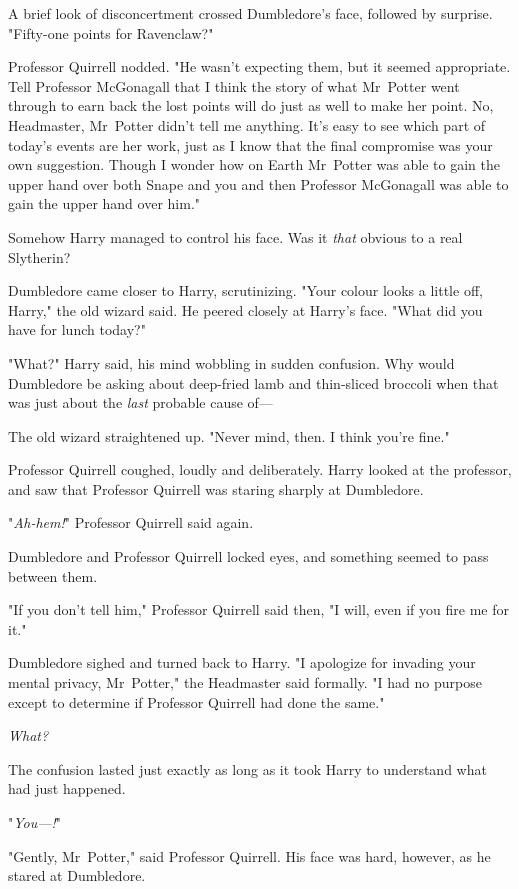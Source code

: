 A brief look of disconcertment crossed Dumbledore's face, followed by surprise.
"Fifty-one points for Ravenclaw?"

Professor Quirrell nodded. "He wasn't expecting them, but it seemed
appropriate. Tell Professor McGonagall that I think the story of what
Mr~Potter went through to earn back the lost points will do just as well to
make her point. No, Headmaster, Mr~Potter didn't tell me anything. It's easy
to see which part of today's events are her work, just as I know that the final
compromise was your own suggestion. Though I wonder how on Earth Mr~Potter was
able to gain the upper hand over both Snape and you and then Professor
McGonagall was able to gain the upper hand over him."

Somehow Harry managed to control his face. Was it \emph{that} obvious to a real
Slytherin?

Dumbledore came closer to Harry, scrutinizing. "Your colour looks a little off,
Harry," the old wizard said. He peered closely at Harry's face. "What did you
have for lunch today?"

"What?" Harry said, his mind wobbling in sudden confusion. Why would Dumbledore
be asking about deep-fried lamb and thin-sliced broccoli when that was just
about the \emph{last} probable cause of—

The old wizard straightened up. "Never mind, then. I think you're fine."

Professor Quirrell coughed, loudly and deliberately. Harry looked at the
professor, and saw that Professor Quirrell was staring sharply at Dumbledore.

"\emph{Ah-hem!}" Professor Quirrell said again.

Dumbledore and Professor Quirrell locked eyes, and something seemed to pass
between them.

"If you don't tell him," Professor Quirrell said then, "I will, even if you
fire me for it."

Dumbledore sighed and turned back to Harry. "I apologize for invading your
mental privacy, Mr~Potter," the Headmaster said formally. "I had no purpose
except to determine if Professor Quirrell had done the same."

\emph{What?}

The confusion lasted just exactly as long as it took Harry to understand what
had just happened.

"\emph{You—!}"

"Gently, Mr~Potter," said Professor Quirrell. His face was hard, however, as
he stared at Dumbledore.

